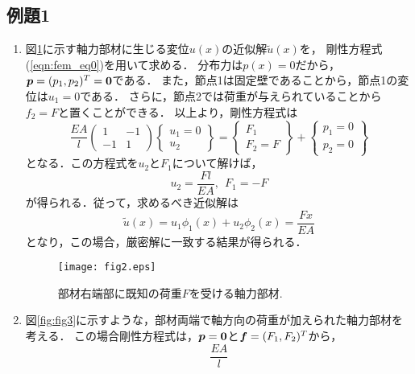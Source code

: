 \documentclass[10pt,a4j]{jarticle}
\begin{document}
\subsection{例題1}
\begin{enumerate}
\item
図\ref{fig:fig2}に示す軸力部材に生じる変位$u(x)$の近似解$\tilde u(x)$を，
剛性方程式(\ref{eqn:fem_eq0})を用いて求める．
分布力は$p(x)=0$だから，$\mbox{\boldmath $p$}=(p_1,p_2)^T=\mbox{\boldmath $0$}$である．
また，節点1は固定壁であることから，節点1の変位は$u_1=0$である．
さらに，節点2では荷重が与えられていることから$f_2=F$と置くことができる．
以上より，剛性方程式は
\begin{equation}
	\frac{EA}{l}
	\left(
	\begin{array}{cc}
		1 & -1 \\
		-1 & 1
	\end{array}
	\right)
	\left\{
	\begin{array}{c}
		u_1=0 \\
		u_2
	\end{array}
	\right\}
	=
	\left\{
	\begin{array}{c}
		F_1\\
		F_2=F
	\end{array}
	\right\}
	+
	\left\{
	\begin{array}{c}
		p_1=0\\
		p_2=0
	\end{array}
	\right\}
\end{equation}
となる．この方程式を$u_2$と$F_1$について解けば，
\begin{equation}
	u_2=\frac{Fl}{EA}, \ \ F_1=-F
	\label{eqn:}
\end{equation}
が得られる．従って，求めるべき近似解は
\begin{equation}
	\tilde u(x)=u_1\phi_1(x)+u_2\phi_2(x)=\frac{Fx}{EA}
	\label{eqn:apprx1}
\end{equation}
となり，この場合，厳密解に一致する結果が得られる．
\begin{figure}[h]
	\begin{center}
	\texttt{[image: fig2.eps]} 
	\end{center}
	\caption{部材右端部に既知の荷重$F$を受ける軸力部材.} 
	\label{fig:fig2}
\end{figure}
\item
図\ref{fig:fig3}に示すような，部材両端で軸方向の荷重が加えられた軸力部材を考える．
この場合剛性方程式は，$\mbox{\boldmath $p$}=\mbox{\boldmath $0$}$と$\mbox{\boldmath $f$}=(F_1,F_2)^T$から，
\begin{equation}
	\frac{EA}{l}

\end{equation}
\end{enumerate}
\end{document}
